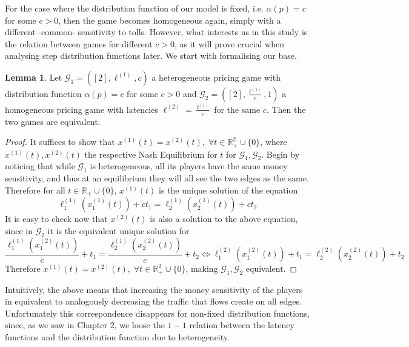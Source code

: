 \documentclass[10pt,a4paper]{book}
\newcommand{\R}{\mathbb{R}}
\newcommand{\Gm}{\mathcal{G}}
\theoremstyle{definition}
\newtheorem{lemma}[definition]{Lemma}
\theoremstyle{comment}
\begin{document}
For the case where the distribution function of our model is fixed, i.e. $\alpha(p) = c$ for some $c > 0$, then the game becomes homogeneous again, simply with a different -common- sensitivity to tolls.
However, what interests us in this study is the relation between games for different $c > 0$, as it will prove crucial when analysing step distribution functions later.
We start with formalising our base.

\begin{lemma}
	\label{lemma:a_fixed_homogeneous}
	Let $\Gm_1 = ([2], \ell^{(1)}, c)$ a heterogeneous pricing game with distribution function $\alpha(p) = c$ for some $c > 0$ and $\Gm_2 = ([2], \frac{\ell^{(1)}}{c}, 1)$ a homogeneous pricing game with latencies $\ell^{(2)} = \frac{\ell^{(1)}}{c}$ for the same $c$.
	Then the two games are equivalent.
\end{lemma}

\begin{proof}
	It suffices to show that $x^{(1)}(t) = x^{(2)}(t), \; \forall t \in \R_+^2 \cup \{0\}$, where $x^{(1)}(t), x^{(2)}(t)$ the respective Nash Equilibrium for $t$ for $\Gm_1, \Gm_2$.
	Begin by noticing that while $\Gm_1$ is heterogeneous, all its players have the same money sensitivity, and thus at an equilibrium they will all see the two edges as the same.
	Therefore for all $t \in \R_+ \cup \{0\}$, $x^{(1)}(t)$ is the unique solution of the equation
	\[
		\ell_1^{(1)}(x_1^{(1)}(t)) + ct_1 = \ell_2^{(1)}(x_2^{(1)}(t)) + ct_2
	\]
	It is easy to check now that $x^{(2)}(t)$ is also a solution to the above equation, since in $\Gm_2$ it is the equivalent unique solution for
	\[
		\frac{\ell_1^{(1)}(x_1^{(2)}(t))}{c} + t_1 = \frac{\ell_2^{(1)}(x_2^{(2)}(t))}{c} + t_2 \Leftrightarrow \ell_1^{(2)}(x_1^{(2)}(t)) + t_1 = \ell_2^{(2)}(x_2^{(2)}(t)) + t_2
	\]
	Therefore $x^{(1)}(t) = x^{(2)}(t), \; \forall t \in \R_+^2 \cup \{0\}$, making $\Gm_1, \Gm_2$ equivalent.
\end{proof}
Intuitively, the above means that increasing the money sensitivity of the players in equivalent to analogously decreasing the traffic that flows create on all edges.
Unfortunately this correspondence  disappears for non-fixed distribution functions, since, as we saw in Chapter 2, we loose the $1-1$ relation between the latency functions and the distribution function due to heterogeneity.
\end{document}
